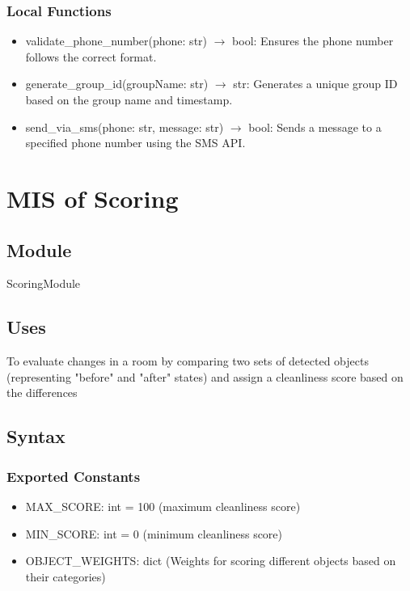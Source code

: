 \documentclass[12pt, titlepage]{article}
\begin{document}
\subsubsection{Local Functions}

\begin{itemize}
  \item validate{\_}phone{\_}number(phone: str) $\rightarrow$ bool: Ensures the phone number follows the correct format.
  \item generate{\_}group{\_}id(groupName: str) $\rightarrow$ str: Generates a unique group ID based on the group name and timestamp.
  \item send{\_}via{\_}sms(phone: str, message: str) $\rightarrow$ bool: Sends a message to a specified phone number using the SMS API.
\end{itemize}

\newpage

\section{MIS of Scoring} \label{Module} 

\subsection{Module}

ScoringModule

\subsection{Uses}
To evaluate changes in a room by comparing two sets of detected objects (representing "before" and "after" states) and assign a cleanliness score based on the differences

\subsection{Syntax}

\subsubsection{Exported Constants}

\begin{itemize}
  \item MAX{\_}SCORE: int = 100 (maximum cleanliness score)
  \item MIN{\_}SCORE: int = 0 (minimum cleanliness score)
  \item OBJECT{\_}WEIGHTS: dict (Weights for scoring different objects based on their categories)
\end{itemize}
\end{document}

